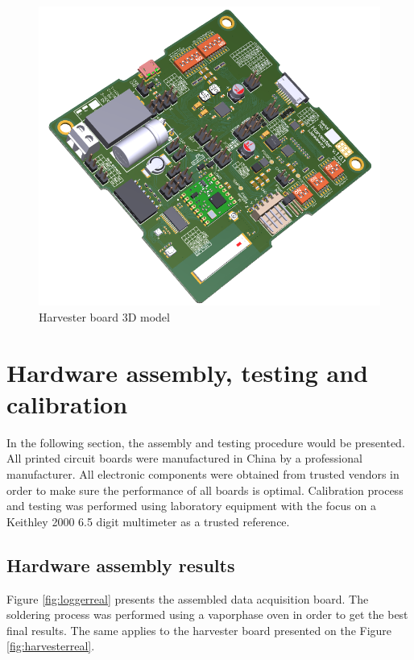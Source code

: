 \documentclass[12pt,a4paper]{article}
\begin{document}
\begin{figure}[ht!]
\includegraphics[scale=0.65]{harvester2.png}
\caption{Harvester board 3D model}
\label{fig:harvester3d}
\end{figure}

\section{Hardware assembly, testing and calibration}

In the following section, the assembly and testing procedure would be presented. All printed circuit boards were manufactured in China by a professional manufacturer. All electronic components were obtained from trusted vendors in order to make sure the performance of all boards is optimal. Calibration process and testing was performed using laboratory equipment with the focus on a Keithley 2000 6.5 digit multimeter as a trusted reference. 

\subsection{Hardware assembly results}
Figure \ref{fig:loggerreal} presents the assembled data acquisition board. The soldering process was performed using a vaporphase oven in order to get the best final results. The same applies to the harvester board presented on the Figure \ref{fig:harvesterreal}. 
\par
\end{document}
